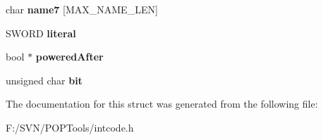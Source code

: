 \begin{DoxyCompactItemize}
\item 
\hypertarget{struct_int_op_tag_aa2a5a0a5a2bfcebedaa9dd87b2254823}{char {\bfseries name7} \mbox{[}M\-A\-X\-\_\-\-N\-A\-M\-E\-\_\-\-L\-E\-N\mbox{]}}\label{struct_int_op_tag_aa2a5a0a5a2bfcebedaa9dd87b2254823}

\item 
\hypertarget{struct_int_op_tag_a7e410eca78990d2a2f3fd1e0f9865918}{S\-W\-O\-R\-D {\bfseries literal}}\label{struct_int_op_tag_a7e410eca78990d2a2f3fd1e0f9865918}

\item 
\hypertarget{struct_int_op_tag_a9ae875b15498254e610453381ffc00a1}{bool $\ast$ {\bfseries powered\-After}}\label{struct_int_op_tag_a9ae875b15498254e610453381ffc00a1}

\item 
\hypertarget{struct_int_op_tag_abdf4dc9631aea42dee6d8b6f740e489c}{unsigned char {\bfseries bit}}\label{struct_int_op_tag_abdf4dc9631aea42dee6d8b6f740e489c}

\end{DoxyCompactItemize}


The documentation for this struct was generated from the following file\-:\begin{DoxyCompactItemize}
\item 
F\-:/\-S\-V\-N/\-P\-O\-P\-Tools/intcode.\-h\end{DoxyCompactItemize}
